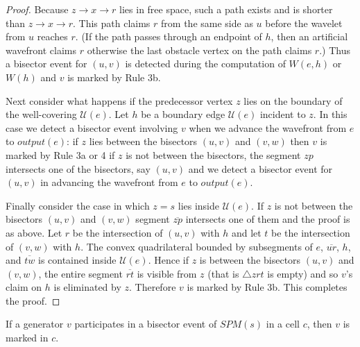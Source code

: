\begin{proof}
	Because $z\to x \to
	r$ lies in free space, such a path exists and is shorter than $z \to x
	\to r$. This path claims $r$ from the same side as $u$ before the wavelet
	from $u$ reaches $r$. (If the path passes through an endpoint of $h$,
	then an artificial wavefront 
	claims $r$ otherwise the last obstacle
	vertex on the path claims $r$.) Thus a bisector event for $(u,v)$ is
	detected during the computation of $W(e,h)$ or $W(h)$ and $v$ is marked
	by Rule 3b.

	Next consider what happens if the predecessor vertex $z$ lies on the
	boundary of the well-covering $\mathcal{U}(e)$. Let $h$ be a boundary
	edge $\mathcal{U}(e)$ incident to $z$. In this case we detect a bisector
	event involving $v$ when we advance the wavefront from $e$ to
	$output(e)$: if $z$ lies between the bisectors $(u,v)$ and $(v,w)$ then
	$v$ is marked by Rule 3a or 4 if $z$ is not between the bisectors, the
	segment $zp$ intersects one of the bisectors, say $(u,v)$ and we detect a
	bisector event for $(u,v)$ in advancing the wavefront from $e$ to
	$output(e)$.

	Finally consider the case in which $z=s$ lies inside $\mathcal{U}(e)$. If
	$z$ is not between the bisectors $(u,v)$ and $(v,w)$ segment
	$\overline{zp}$ intersects one of them and the proof is as above. Let $r$
	be the intersection of $(u,v)$ with $h$ and let $t$ be the intersection
	of $(v,w)$ with $h$. The convex quadrilateral bounded by subsegments of
	$e$, $\overline{ur}$, $h$, and $\overline{tw}$ is contained inside
	$\mathcal{U}(e)$. Hence if $z$ is between the bisectors $(u,v)$ and
	$(v,w)$, the entire segment $\overline{rt}$ is visible from $z$ (that is
	$\bigtriangleup zrt$ is empty) and so $v$'s claim on $h$ is eliminated by
	$z$. Therefore $v$ is marked by Rule 3b. This completes the proof.

\end{proof}
\begin{Lemma}\label{lemma:4.9HershbergerS99}
	If a generator $v$ participates in a bisector event of $SPM(s)$ in a cell
	$c$, then $v$ is marked in $c$.
\end{Lemma}
